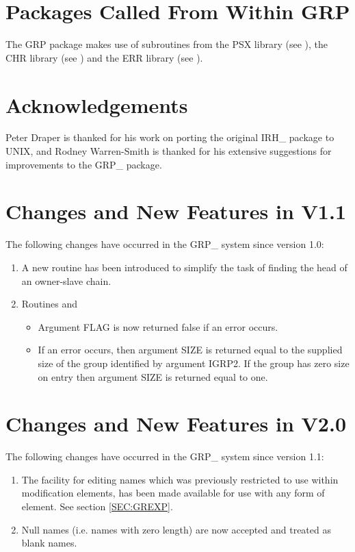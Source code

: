 \section{\label{APP:PACK}Packages Called From Within GRP}
The GRP package makes use of subroutines from the PSX
library (see ), the CHR library (see
) and the ERR library (see
).

\section{Acknowledgements}

Peter Draper is thanked for his work on porting the original IRH\_ package to
UNIX, and Rodney Warren-Smith is thanked for his extensive suggestions for
improvements to the GRP\_ package.

\section{Changes and New Features in V1.1}
The following changes have occurred in the GRP\_ system since version 1.0:
\begin{enumerate}
\item A new routine  has been introduced to simplify the task of
finding the head of an owner-slave chain.
\item Routines  and 
\begin{itemize}
\item Argument FLAG is now returned false if an error occurs.
\item If an error occurs, then argument SIZE is returned equal to the supplied
size of the group identified by argument IGRP2. If the group has zero size on
entry then argument SIZE is returned equal to one.
\end{itemize}
\end{enumerate}

\section{Changes and New Features in V2.0}
The following changes have occurred in the GRP\_ system since version 1.1:
\begin{enumerate}
\item The facility for editing names which was previously restricted to use
within modification elements, has been made available for use with any form
of element. See section \ref{SEC:GREXP}.
\item Null names (i.e. names with zero length) are now accepted and treated as
blank names.
\end{enumerate}


